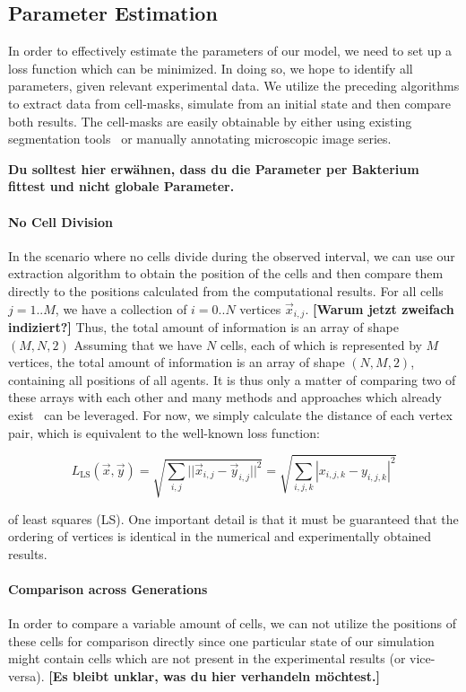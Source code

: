 \documentclass{article}
\begin{document}
\subsection{Parameter Estimation}
\label{section:parameter-estimation}
In order to effectively estimate the parameters of our model, we need to set up a loss function
which can be minimized. In doing so, we hope to identify all parameters, given relevant experimental data.
We utilize the preceding algorithms to extract data from cell-masks, simulate from an initial state
and then compare both results.
The cell-masks are easily obtainable by either using existing segmentation
tools~\cite{Cutler2022,Stringer2020,Hardo2022} or manually annotating microscopic image series.

\textbf{Du solltest hier erwähnen, dass du die Parameter per Bakterium fittest und nicht globale Parameter.}

\paragraph{No Cell Division}
In the scenario where no cells divide during the observed interval, we can use our extraction
algorithm to obtain the position of the cells and then compare them directly to the positions
calculated from the computational results. For all cells $j=1..M$, we have a collection of $i=0..N$ vertices $\vec{x}_{i,j}$. \textbf{[Warum jetzt zweifach indiziert?]} Thus, the total amount of information is an array of shape $(M,N,2)$ Assuming that we have $N$ cells, each of which is represented by $M$ vertices, the total amount of information is an array of shape $(N,M,2)$, containing all positions of all agents.
It is thus only a matter of comparing two of these arrays with each other and many methods and
approaches which already exist~\cite{Wang2020} can be leveraged. For now, we simply calculate the distance of each vertex pair, which is equivalent to the
well-known loss function:

\begin{equation}
    L_{\text{LS}}(\vec{x}, \vec{y})
        = \sqrt{\sum\limits_{i,j}||\vec{x}_{i,j}-\vec{y}_{i,j}||^2}
        = \sqrt{\sum\limits_{i,j,k}|x_{i,j,k}-y_{i,j,k}|^2}
\end{equation}

of least squares (LS).
One important detail is that it must be guaranteed that the ordering of vertices is identical in the
numerical and experimentally obtained results.

\paragraph{Comparison across Generations}
In order to compare a variable amount of cells, we can not utilize the positions of these cells
for comparison directly since one particular state of our simulation might contain cells which are
not present in the experimental results (or vice-versa).
\textbf{[Es bleibt unklar, was du hier verhandeln möchtest.]}
\end{document}
